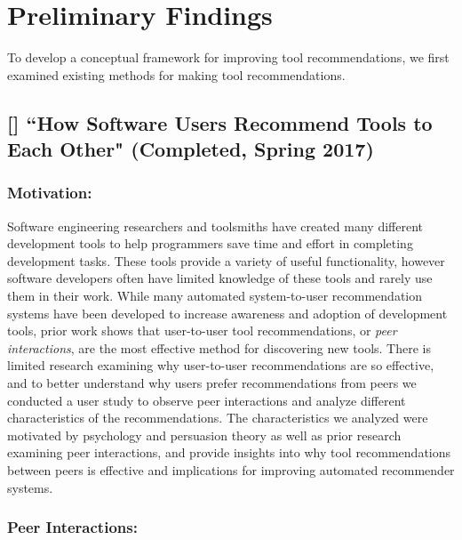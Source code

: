 \section{Preliminary Findings}
 
To develop a conceptual framework for improving tool recommendations, we first examined existing methods for making tool recommendations.

\subsection{[\peer] ``How Software Users Recommend Tools to Each Other" (Completed, Spring 2017)}

\subsubsection{Motivation:}


Software engineering researchers and toolsmiths have created many different development tools to help programmers save time and effort in completing development tasks. These tools provide a variety of useful functionality, however software developers often have limited knowledge of these tools and rarely use them in their work. While many automated system-to-user recommendation systems have been developed to increase awareness and adoption of development tools, prior work shows that user-to-user tool recommendations, or \textit{peer interactions}, are the most effective method for discovering new tools. There is limited research examining why user-to-user recommendations are so effective, and to better understand why users prefer recommendations from peers we conducted a user study to observe peer interactions and analyze different characteristics of the recommendations. The characteristics we analyzed were motivated by psychology and persuasion theory as well as prior research examining peer interactions, and provide insights into why tool recommendations between peers is effective and implications for improving automated recommender systems.

\subsubsection{Peer Interactions:}

